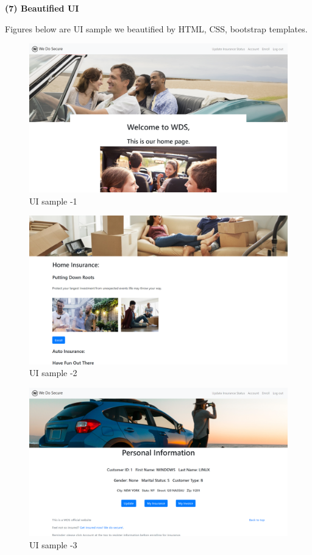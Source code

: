 \documentclass[12pt]{article}
\begin{document}
    \newpage
    \noindent\textbf{(7) Beautified UI}\\\par
    Figures below are UI sample we beautified by HTML, CSS, bootstrap templates. 
    \begin{figure}[H]
    	\centering
    	\includegraphics[scale=0.09]{ui.png}
    	\caption{UI sample -1}
    \end{figure}
    \begin{figure}[H]
    	\centering
    	\includegraphics[scale=0.09]{ui1.png}
    	\caption{UI sample -2}
    \end{figure}
	\begin{figure}[H]
		\centering
		\includegraphics[scale=0.09]{ui2.png}
		\caption{UI sample -3}
	\end{figure}
    
\end{document}
